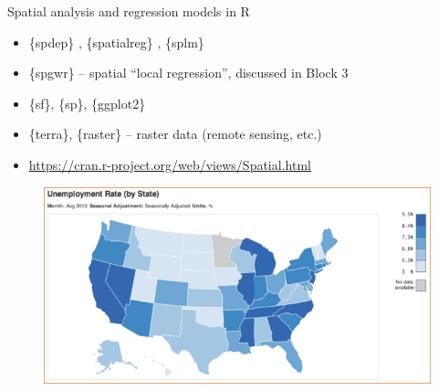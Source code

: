 \documentclass{beamer}
\begin{document}
\begin{frame}{Spatial analysis and regression models in R}
\begin{itemize}
	\item \{spdep\} , \{spatialreg\} , \{splm\} 
	\item \{spgwr\} -- spatial ``local regression'', discussed in Block 3
	\item \{sf\}, \{sp\}, \{ggplot2\}
        \item \{terra\}, \{raster\} -- raster data (remote sensing, etc.)
	\item \textcolor{blue}{\underline{\href{https://cran.r-project.org/web/views/Spatial.html}{https://cran.r-project.org/web/views/Spatial.html}}}
\end{itemize}
 \begin{figure}
 	\includegraphics[width=.7\textwidth]{IMG/sp_unemp.PNG}
 \end{figure}
\end{frame}
\end{document}

